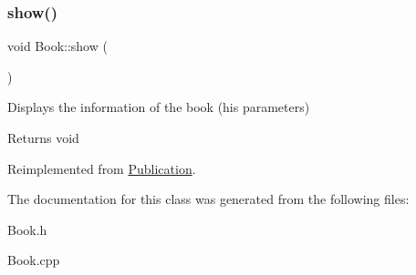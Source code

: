 \subsubsection{\texorpdfstring{show()}{show()}}
{\footnotesize\ttfamily void Book\+::show (\begin{DoxyParamCaption}{ }\end{DoxyParamCaption})\hspace{0.3cm}{\ttfamily [virtual]}}



Displays the information of the book (his parameters) 

\begin{DoxyReturn}{Returns}
void 
\end{DoxyReturn}


Reimplemented from \hyperlink{class_publication_aa4240a04fcecd6257e0d1a33e8f18ff0}{Publication}.



The documentation for this class was generated from the following files\+:\begin{DoxyCompactItemize}
\item 
Book.\+h\item 
Book.\+cpp\end{DoxyCompactItemize}
